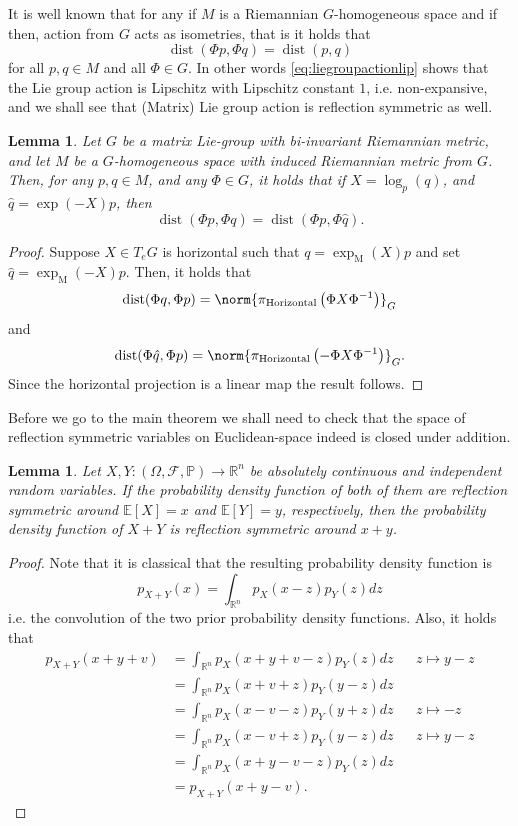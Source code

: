\documentclass[12pt,a4paper]{article}
\newtheorem{lemma}[theorem]{Lemma}
\theoremstyle{definition}
\theoremstyle{remark}
\DeclareMathOperator{\dist}{dist}
\begin{document}
It is well known that for any if $M$ is a Riemannian $G$-homogeneous space and if then, action from $G$ acts as isometries, that is it holds that
\begin{equation}
\dist(\Phi p, \Phi q) = \dist(p,q)
\label{eq:liegroupactionlip}
\end{equation}
for all $p,q\in M$ and all $\Phi \in G$. In other words \eqref{eq:liegroupactionlip} shows that the Lie group action is Lipschitz with Lipschitz constant $1$, i.e. non-expansive, and we shall see that (Matrix) Lie group action is reflection symmetric as well.

\begin{lemma}
\label{lem:distancelem}
Let $G$ be a matrix Lie-group with bi-invariant Riemannian metric, and let $M$ be a $G$-homogeneous space with induced Riemannian metric from $G$. Then, for any $p,q\in M$, and any $\Phi \in G$, it holds that if $X = \log_p(q)$, and $\hat{q}=\exp(-X)p$, then
\[
\dist(\Phi p,\Phi q)= \dist(\Phi p, \Phi \hat{q}).
\]
\end{lemma}

\begin{proof}
Suppose $X\in T_eG$ is horizontal such that $q=\exp_{\mathrm{M}}(X)p$ and set $\hat{q}=\exp_{\mathrm{M}}(-X)p$. Then, it holds that
\[
\dist(\Phi q,\Phi p) = \norm{\pi_{\text{Horizontal}}\left( \Phi X \Phi^{-1}\right)}_G
\]
and
\[
\dist(\Phi \hat{q},\Phi p) = \norm{\pi_{\text{Horizontal}}\left( -\Phi X \Phi^{-1}\right)}_G.
\]
Since the horizontal projection is a linear map the result follows.
\end{proof}

Before we go to the main theorem we shall need to check that the space of reflection symmetric variables on Euclidean-space indeed is closed under addition.

\begin{lemma}
\label{lem:convsymm}
Let $X,Y:(\Omega,\mathcal{F},\mathbb{P})\rightarrow \mathbb{R}^n$ be absolutely continuous and independent random variables. If the probability density function of both of them are reflection symmetric around $\mathbb{E}[X]=x$ and $\mathbb{E}[Y]=y$, respectively, then the probability density function of $X+Y$ is reflection symmetric around $x+y$.
\end{lemma}

\begin{proof}
Note that it is classical that the resulting probability density function is
\[
p_{X+Y}(x) = \int_{\mathbb{R}^n} p_X(x-z)p_Y(z) dz
\]
i.e. the convolution of the two prior probability density functions. Also, it holds that
\[
\begin{aligned}
p_{X+Y}(x+y+v) &= \int_{\mathbb{R}^n} p_X(x+y+v-z) p_Y(z) dz&& z\mapsto y-z\\
&= \int_{\mathbb{R}^n} p_X(x+v+z) p_Y(y-z) dz\\
&= \int_{\mathbb{R}^n} p_X(x-v-z) p_Y(y+z) dz&& z\mapsto -z\\
&= \int_{\mathbb{R}^n} p_X(x-v+z) p_Y(y-z) dz&& z\mapsto y-z\\
&= \int_{\mathbb{R}^n} p_X(x+y-v-z) p_Y(z) dz\\
&= p_{X+Y}(x+y-v).
\end{aligned}
\]
\end{proof}
\end{document}
